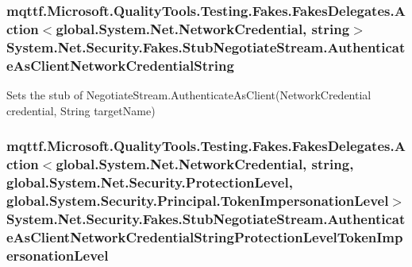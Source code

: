 \hypertarget{class_system_1_1_net_1_1_security_1_1_fakes_1_1_stub_negotiate_stream_aad84189e14cfad50f1448dae0a416a78}{
\subsubsection[{Authenticate\-As\-Client\-Network\-Credential\-String}]{\setlength{\rightskip}{0pt plus 5cm}mqttf.\-Microsoft.\-Quality\-Tools.\-Testing.\-Fakes.\-Fakes\-Delegates.\-Action$<$global.\-System.\-Net.\-Network\-Credential, string$>$ System.\-Net.\-Security.\-Fakes.\-Stub\-Negotiate\-Stream.\-Authenticate\-As\-Client\-Network\-Credential\-String}}\label{class_system_1_1_net_1_1_security_1_1_fakes_1_1_stub_negotiate_stream_aad84189e14cfad50f1448dae0a416a78}


Sets the stub of Negotiate\-Stream.\-Authenticate\-As\-Client(\-Network\-Credential credential, String target\-Name)

\hypertarget{class_system_1_1_net_1_1_security_1_1_fakes_1_1_stub_negotiate_stream_ac58414427952817b335a38c2d0345775}{
\subsubsection[{Authenticate\-As\-Client\-Network\-Credential\-String\-Protection\-Level\-Token\-Impersonation\-Level}]{\setlength{\rightskip}{0pt plus 5cm}mqttf.\-Microsoft.\-Quality\-Tools.\-Testing.\-Fakes.\-Fakes\-Delegates.\-Action$<$global.\-System.\-Net.\-Network\-Credential, string, global.\-System.\-Net.\-Security.\-Protection\-Level, global.\-System.\-Security.\-Principal.\-Token\-Impersonation\-Level$>$ System.\-Net.\-Security.\-Fakes.\-Stub\-Negotiate\-Stream.\-Authenticate\-As\-Client\-Network\-Credential\-String\-Protection\-Level\-Token\-Impersonation\-Level}}\label{class_system_1_1_net_1_1_security_1_1_fakes_1_1_stub_negotiate_stream_ac58414427952817b335a38c2d0345775}


